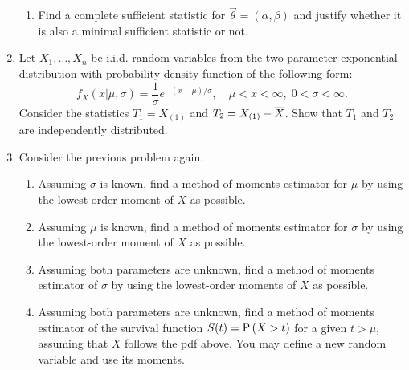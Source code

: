 \documentclass[titlepage]{article}
\begin{document}
\begin{enumerate}
\begin{enumerate}
    \item Find a complete sufficient statistic for $\vec{\theta} = (\alpha, \beta)$ and justify whether it is also a minimal sufficient statistic or not.
  \end{enumerate}

\item Let $X_1, \ldots, X_n$ be i.i.d. random variables from the two-parameter exponential distribution with probability density function of the following form:
\[f_X(x|\mu, \sigma) = \frac{1}{\sigma}e^{-(x - \mu)/\sigma}, \quad \mu < x < \infty, \; 0 < \sigma < \infty.\]
Consider the statistics $T_1 = X_{(1)}$ and $T_2 = X_{(1)} - \Xbar$. Show that $T_1$ and $T_2$ are independently distributed.

\item Consider the previous problem again.
\begin{enumerate}
  \item Assuming $\sigma$ is known, find a method of moments estimator for $\mu$ by using the lowest-order moment of $X$ as possible.

  \item Assuming $\mu$ is known, find a method of moments estimator for $\sigma$ by using the lowest-order moment of $X$ as possible.

  \item Assuming both parameters are unknown, find a method of moments estimator of $\sigma$ by using the lowest-order moments of $X$ as possible.

  \item Assuming both parameters are unknown, find a method of moments estimator of the survival function $S(t) = \P{X > t}$ for a given $t > \mu$, assuming that $X$ follows the pdf above. You may define a new random variable and use its moments.
\end{enumerate}

\end{enumerate}
\end{document}

